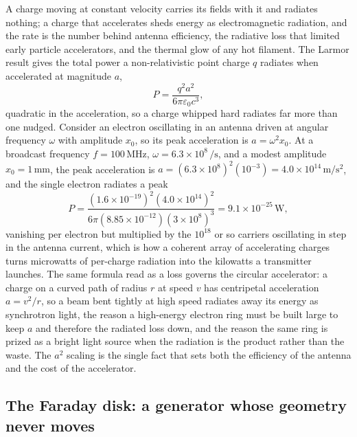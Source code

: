 A charge moving at constant velocity carries its fields with it and
radiates nothing; a charge that accelerates sheds energy as electromagnetic
radiation, and the rate is the number behind antenna efficiency, the
radiative loss that limited early particle accelerators, and the thermal
glow of any hot filament. The Larmor result gives the total power a
non-relativistic point charge $q$ radiates when accelerated at magnitude
$a$,
\[
P = \frac{q^{2} a^{2}}{6\pi\varepsilon_0 c^{3}},
\]
quadratic in the acceleration, so a charge whipped hard radiates far more
than one nudged. Consider an electron oscillating in an antenna driven at
angular frequency $\omega$ with amplitude $x_0$, so its peak acceleration is
$a = \omega^{2} x_0$. At a broadcast frequency $f = 100\,\si{\mega\hertz}$,
$\omega = 6.3\times 10^{8}\,\si{\per\second}$, and a modest amplitude
$x_0 = 1\,\si{\milli\meter}$, the peak acceleration is $a = (6.3\times
10^{8})^{2}(10^{-3}) = 4.0\times 10^{14}\,\si{\meter\per\second\squared}$,
and the single electron radiates a peak
\[
P = \frac{(1.6\times 10^{-19})^{2}(4.0\times 10^{14})^{2}}{6\pi(8.85\times
10^{-12})(3\times 10^{8})^{3}} = 9.1\times 10^{-25}\,\si{\watt},
\]
vanishing per electron but multiplied by the $10^{18}$ or so carriers
oscillating in step in the antenna current, which is how a coherent array
of accelerating charges turns microwatts of per-charge radiation into the
kilowatts a transmitter launches. The same formula read as a loss governs
the circular accelerator: a charge on a curved path of radius $r$ at speed
$v$ has centripetal acceleration $a = v^{2}/r$, so a beam bent tightly at
high speed radiates away its energy as synchrotron light, the reason a
high-energy electron ring must be built large to keep $a$ and therefore the
radiated loss down, and the reason the same ring is prized as a bright
light source when the radiation is the product rather than the waste. The
$a^{2}$ scaling is the single fact that sets both the efficiency of the
antenna and the cost of the accelerator.

\subsection{The Faraday disk: a generator whose geometry never moves}

